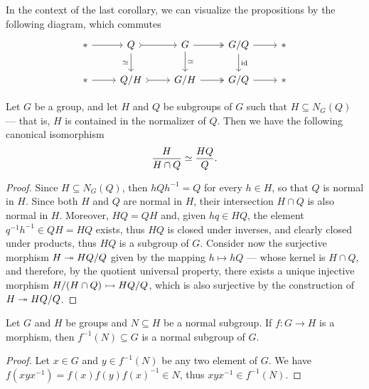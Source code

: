 In the context of the last corollary, we can visualize the propositions by the
following diagram, which commutes
\[
  \begin{tikzcd}
    * \ar[r] &Q \ar[r, tail] \ar[d, "\iso"']
    &G \ar[r, two heads] \ar[d, "\iso"]
    &G/Q \ar[r] \ar[d, "\Id"] &*
    \\
    * \ar[r] &Q/H \ar[r, tail] &G/H \ar[r, two heads] &G/Q \ar[r] &*
  \end{tikzcd}
\]

\begin{corollary}
\label{cor:grp-intersection-coset-isomorphism}
Let \(G\) be a group, and let \(H\) and \(Q\) be subgroups of \(G\) such that
\(H \subseteq N_G(Q)\) --- that is, \(H\) is contained in the normalizer of
\(Q\). Then we have the following canonical isomorphism
\[
  \frac{H}{H \cap Q} \simeq \frac{H Q}{Q}.
\]
\end{corollary}

\begin{proof}
Since \(H \subseteq N_G(Q)\), then \(hQh^{-1} = Q\) for every \(h \in H\), so
that \(Q\) is normal in \(H\). Since both \(H\) and \(Q\) are normal in \(H\),
their intersection \(H \cap Q\) is also normal in \(H\). Moreover, \(HQ = QH\)
and, given \(hq \in HQ\), the element \(q^{-1} h^{-1} \in Q H = H Q\) exists, thus
\(HQ\) is closed under inverses, and clearly closed under products, thus \(HQ\)
is a subgroup of \(G\). Consider now the surjective morphism \(H \twoheadrightarrow H Q / Q\)
given by the mapping \(h \mapsto h Q\) --- whose kernel is \(H \cap Q\), and
therefore, by the quotient universal property, there exists a unique injective
morphism \(H/(H \cap Q) \rightarrowtail HQ/Q\), which is also surjective by the
construction of \(H \twoheadrightarrow H Q / Q\).
\end{proof}

\begin{proposition}
\label{prop:morphisms-preserve-normality}
Let \(G\) and \(H\) be groups and \(N \subseteq H\) be a normal subgroup. If
\(f: G \to H\) is a morphism, then \(f^{-1}(N) \subseteq G\) is a normal
subgroup of \(G\).
\end{proposition}

\begin{proof}
Let \(x \in G\) and \(y \in f^{-1}(N)\) be any two element of \(G\). We have
\(f(x y x^{-1}) = f(x) f(y) f(x)^{-1} \in N\), thus \(x y x^{-1} \in f^{-1}(N)\).
\end{proof}

